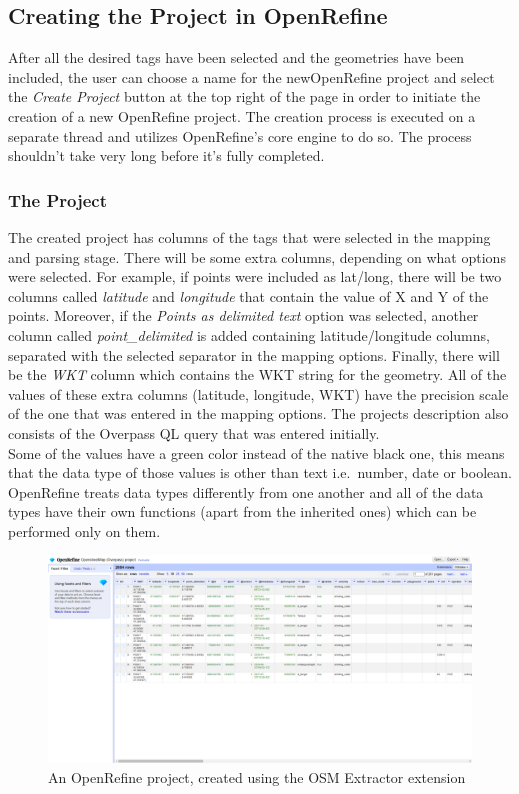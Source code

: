 \subsection{Creating the Project in OpenRefine}
After all the desired tags have been selected and the geometries have been included, the user can choose a
name for the newOpenRefine project and select the \textit{Create Project} button at the top right of the
page in order to initiate the creation of a new OpenRefine project.
The creation process is executed on a separate thread and utilizes OpenRefine's core engine to do so.
The process shouldn't take very long before it's fully completed.
\subsubsection{The Project}
The created project has columns of the tags that were selected in the mapping and parsing stage. There will be some extra columns,
depending on what options were selected. For example, if points were included as lat/long, there will be two columns called \textit{latitude}
and \textit{longitude} that contain the value of X and Y of the points. Moreover, if the \textit{Points as delimited text} option was selected,
another column called \textit{point\_delimited} is added containing latitude/longitude columns, separated with
the selected separator in the mapping options. Finally, there will be the \textit{WKT} column which contains
the WKT string for the geometry. All of the values of these extra columns (latitude, longitude, WKT) have the precision scale of the one that was entered in
the mapping options. The project\textquotesingle s description also consists of the Overpass QL query that was entered initially.\\
\newline
Some of the values have a green color instead of the native black one, this means that the data type of those values is other
than text i.e.\ number, date or boolean.
OpenRefine treats data types differently from one another and all of the data types
have their own functions (apart from the inherited ones) which can be performed
only on them.\\
\begin{figure}[H]
    \includegraphics[width=\linewidth]{./Figures/OSM_Extractor/osm_extractor_project.png}
    \caption{An OpenRefine project, created using the OSM Extractor extension}
\end{figure}

